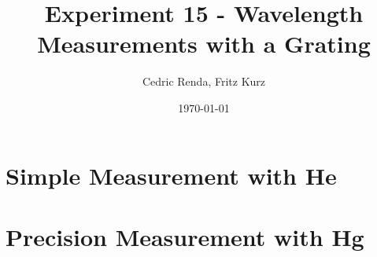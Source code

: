 \documentclass[12pt,a4paper]{article}
\title{Experiment 15 - Wavelength Measurements with a Grating}
\author{Cedric Renda, Fritz Kurz}
\date{\today }
\begin{document}
\maketitle




\tableofcontents


\section{Simple Measurement with He}



\section{Precision Measurement with Hg}






\newpage

\end{document}
